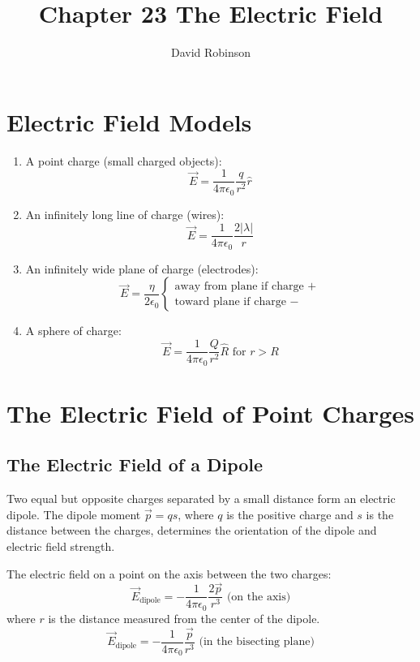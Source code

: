 \documentclass{article}
\title{Chapter 23 The Electric Field}
\author{David Robinson}
\date{}
\begin{document}
\maketitle

\section*{Electric Field Models}

\begin{enumerate}
    \item A point charge (small charged objects):
    \[\vec{E}=\frac{1}{4\pi\epsilon_0}\frac{q}{r^2}\hat{r}\]
    \item An infinitely long line of charge (wires):
    \[\vec{E}=\frac{1}{4\pi\epsilon_0}\frac{2|\lambda |}{r}\]
    \item An infinitely wide plane of charge (electrodes):
    \[\vec{E}=\frac{\eta}{2\epsilon_0}\begin{cases}
        \text{away from plane if charge } + \\
        \text{toward plane if charge } -
    \end{cases}\]
    \item A sphere of charge:
    \[\vec{E}=\frac{1}{4\pi\epsilon_0}\frac{Q}{r^2}\hat{R}\text{ for }r > R\]
\end{enumerate}

\section*{The Electric Field of Point Charges}

\subsection*{The Electric Field of a Dipole}

Two equal but opposite charges separated by a small distance form an electric dipole. The dipole
moment $\vec{p}=qs$, where $q$ is the positive charge and $s$ is the distance between the charges,
determines the orientation of the dipole and electric field strength. \newline

The electric field on a point on the axis between the two charges:
\[\vec{E}_{\text{dipole}}=-\frac{1}{4\pi\epsilon_0}\frac{2\vec{p}}{r^3} \text{ (on the axis)}\]
where $r$ is the distance measured from the center of the dipole.
\[\vec{E}_{\text{dipole}}=-\frac{1}{4\pi\epsilon_0}\frac{\vec{p}}{r^3} 
\text{ (in the bisecting plane)}\]
\end{document}

